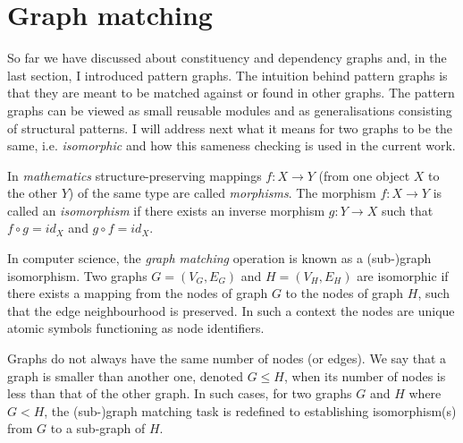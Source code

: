 \section{Graph matching}
\label{sec:graph-matching}

    So far we have discussed about constituency and dependency graphs and, in the last section, I introduced pattern graphs. The intuition behind pattern graphs is that they are meant to be matched against or found in other graphs. The pattern graphs can be viewed as small reusable modules and as generalisations consisting of structural patterns. I will address next what it means for two graphs to be the same, i.e. \textit{isomorphic} and how this sameness checking is used in the current work. 

    In \textit{mathematics} structure-preserving mappings $f:X \rightarrow Y$ (from one object $X$ to the other $Y$) of the same type are called \textit{morphisms}. The morphism $f:X \rightarrow Y$ is called an \textit{isomorphism} if there exists an inverse morphism $g:Y \rightarrow X$ such that $f \circ g = id_{X}$ and $ g \circ f = id_{X}$.


    In computer science, the \textit{graph matching} operation is known as a (sub-)graph isomorphism. Two graphs $G=(V_G,E_G)$ and $H=(V_H,E_H)$ are isomorphic if there exists a mapping from the nodes of graph $G$ to the nodes of graph $H$, such that the edge neighbourhood is preserved. In such a context the nodes are unique atomic symbols functioning as node identifiers. 
 
    Graphs do not always have the same number of nodes (or edges). We say that a graph is smaller than another one, denoted $G \leq H$, when its number of nodes is less than that of the other graph. In such cases, for two graphs $G$ and $H$ where $G<H$, the (sub-)graph matching task is redefined to establishing isomorphism(s) from $G$ to a sub-graph of $H$. 
    
